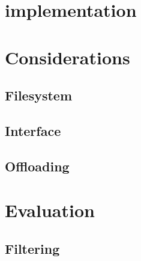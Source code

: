 \documentclass[conference]{IEEEtran}
\begin{document}

\section{implementation}

\section{Considerations}

\subsection{Filesystem}




\subsection{Interface}





\subsection{Offloading}


\section{Evaluation}

\subsection{Filtering}
\end{document}
